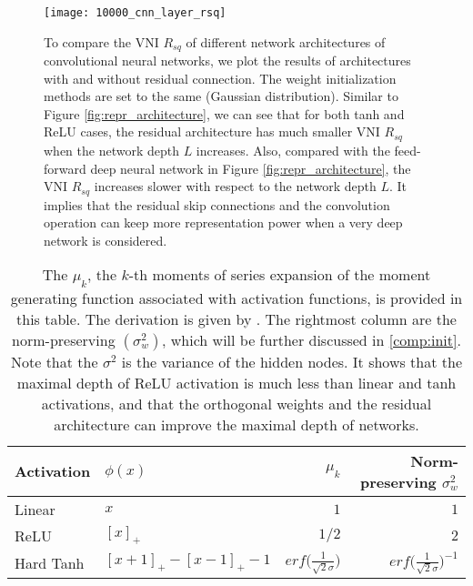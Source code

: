 \begin{figure}[h]
    \newcommand{\myWidth}{0.9\textwidth}
    \centering
    \texttt{[image: 10000\_cnn\_layer\_rsq]}
    \caption[The initial VNI $R_{sq}$ of convolutional neural networks.]{
    To compare the VNI $R_{sq}$ of different network architectures of convolutional neural networks,
    we plot the results of architectures with and without residual connection.
    The weight initialization methods are set to the same (Gaussian distribution).
    Similar to Figure \ref{fig:repr_architecture}, we can see that for both tanh and ReLU cases,
    the residual architecture has much smaller VNI $R_{sq}$ when the network depth $L$ increases.
    Also, compared with the feed-forward deep neural network in Figure \ref{fig:repr_architecture},
    the VNI $R_{sq}$ increases slower with respect to the network depth $L$.
    It implies that the residual skip connections and the convolution operation can keep more
    representation power when a very deep network is considered.
    }
    \label{fig:repr_cnn}
\end{figure}


\begin{table}[h]
    \centering
    \begin{tabular}{|l|l|r|r|}
    \hline
        Activation & $\phi(x)$ & $\mu_k$ & Norm-preserving $\sigma_w^2$\\\hline
        Linear & $x$ & $1$ & $1$\\\hline
        ReLU & $[x]_{+}$ & $1/2$ & $2$\\\hline
        Hard Tanh & $[x+1]_{+}-[x-1]_{+}-1$ & $erf\Big(\frac{1}{\sqrt{2}\sigma}\Big)$
        & $erf\Big(\frac{1}{\sqrt{2}\sigma}\Big)^{-1}$\\\hline
    \end{tabular}
    \caption[The $\mu_k$ of different activation functions.]
    {The $\mu_k$, the $k$-th moments of series expansion of the moment generating function
    associated with activation functions, is provided in this table.
    The derivation is given by \cite{mft:spectral}.
    The rightmost column are the norm-preserving $(\sigma_w^2)$, which will be further
    discussed in \ref{comp:init}.
    Note that the $\sigma^2$ is the variance of the hidden nodes.
    It shows that the maximal depth of ReLU activation is much less than linear and tanh
    activations, and that the orthogonal weights and the residual architecture can improve
    the maximal depth of networks.}
    \label{table:mu}
\end{table}


